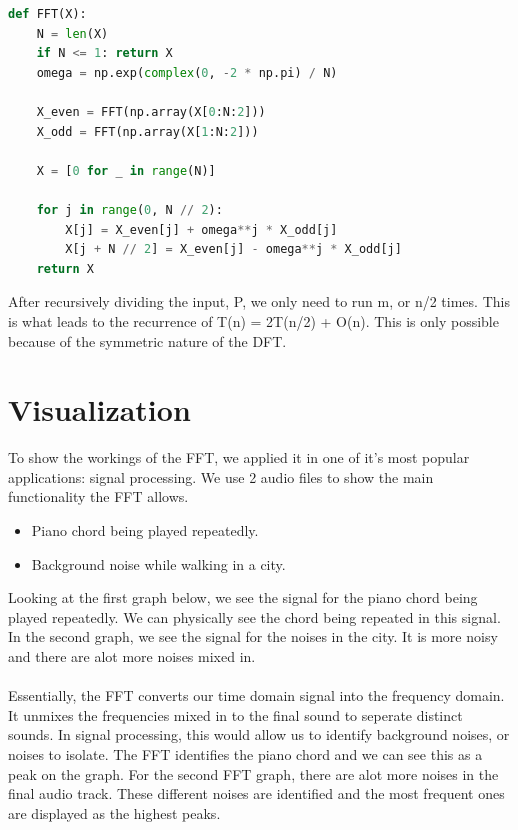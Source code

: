 \documentclass[paper=a4, fontsize=11pt]{scrartcl}
\numberwithin{equation}{section}		%
\numberwithin{figure}{section}			%
\numberwithin{table}{section}				%
\begin{document}
\begin{lstlisting}[language=python, caption= {A python program to compute DFT of a given signal using the fast fourier transform}, captionpos=b]
def FFT(X):
    N = len(X)
    if N <= 1: return X
    omega = np.exp(complex(0, -2 * np.pi) / N)

    X_even = FFT(np.array(X[0:N:2]))
    X_odd = FFT(np.array(X[1:N:2]))

    X = [0 for _ in range(N)]

    for j in range(0, N // 2):
        X[j] = X_even[j] + omega**j * X_odd[j]
        X[j + N // 2] = X_even[j] - omega**j * X_odd[j]
    return X
\end{lstlisting}


After recursively dividing the input, P, we only need to run m, or n/2 times. This is what leads to the recurrence of T(n) = 2T(n/2) + O(n). This is only possible because of the symmetric nature of the DFT.

\section{Visualization}

To show the workings of the FFT, we applied it in one of it's most popular applications: signal processing.
We use 2 audio files to show the main functionality the FFT allows.
\begin{itemize}
\item Piano chord being played repeatedly.
\item Background noise while walking in a city.
\end{itemize}
Looking at the first graph below, we see the signal for the piano chord being played repeatedly. We can physically see the chord being repeated in this signal.
In the second graph, we see the signal for the noises in the city. It is more noisy and there are alot more noises mixed in.\\ \\
Essentially, the FFT converts our time domain signal into the frequency domain. It unmixes the frequencies mixed in to the final sound to seperate distinct sounds. In signal processing, this would allow us to identify background noises, or noises to isolate. The FFT identifies the piano chord and we can see this as a peak on the graph. For the second FFT graph, there are alot more noises in the final audio track. These different noises are identified and the most frequent ones are displayed as the highest peaks.
\end{document}
